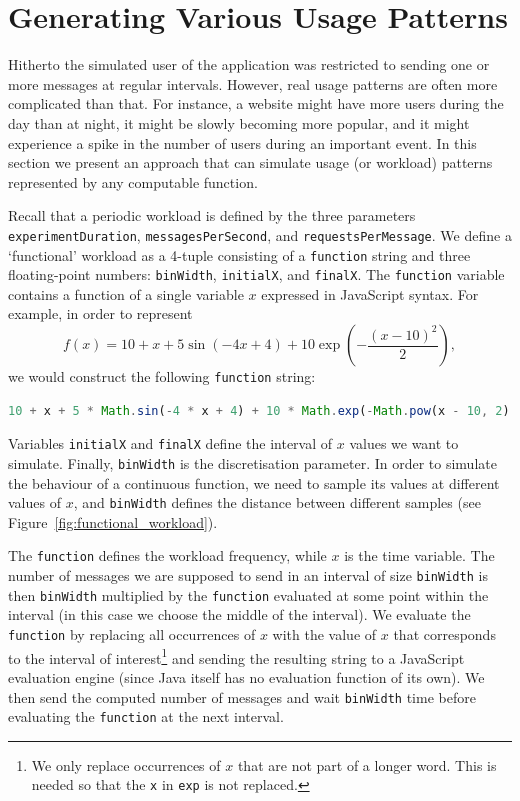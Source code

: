 \documentclass{article}
\begin{document}
\section{Generating Various Usage Patterns}

Hitherto the simulated user of the application was restricted to sending one or
more messages at regular intervals. However, real usage patterns are often more
complicated than that. For instance, a website might have more users during the
day than at night, it might be slowly becoming more popular, and it might
experience a spike in the number of users during an important event. In this
section we present an approach that can simulate usage (or workload) patterns
represented by any computable function.

Recall that a periodic workload is defined by the three parameters
\texttt{experimentDuration}, \texttt{messagesPerSecond}, and
\texttt{requestsPerMessage}. We define a `functional' workload as a 4-tuple
consisting of a \texttt{function} string and three floating-point numbers:
\texttt{binWidth}, \texttt{initialX}, and \texttt{finalX}. The \texttt{function}
variable contains a function of a single variable $x$ expressed in JavaScript
syntax. For example, in order to represent
\begin{equation} \label{eq:example_function}
  f(x) = 10 + x + 5\sin(-4x + 4) + 10\exp \left( -\frac{(x - 10)^2}{2} \right),
\end{equation}
we would construct the following \texttt{function} string:
\begin{lstlisting}[language=JavaScript]
10 + x + 5 * Math.sin(-4 * x + 4) + 10 * Math.exp(-Math.pow(x - 10, 2) / 2).
\end{lstlisting}
Variables \texttt{initialX} and \texttt{finalX} define the interval of $x$
values we want to simulate. Finally, \texttt{binWidth} is the discretisation
parameter. In order to simulate the behaviour of a continuous function, we need
to sample its values at different values of $x$, and \texttt{binWidth} defines
the distance between different samples (see
Figure~\ref{fig:functional_workload}).

The \texttt{function} defines the workload frequency, while $x$ is the time
variable. The number of messages we are supposed to send in an interval of size
\texttt{binWidth} is then \texttt{binWidth} multiplied by the \texttt{function}
evaluated at some point within the interval (in this case we choose the middle
of the interval). We evaluate the \texttt{function} by replacing all occurrences
of $x$ with the value of $x$ that corresponds to the interval of
interest\footnote{We only replace occurrences of $x$ that are not part of a
  longer word. This is needed so that the \texttt{x} in \texttt{exp} is not
  replaced.} and sending the resulting string to a JavaScript evaluation engine
(since Java itself has no evaluation function of its own). We then send the
computed number of messages and wait \texttt{binWidth} time before evaluating
the \texttt{function} at the next interval.
\end{document}

